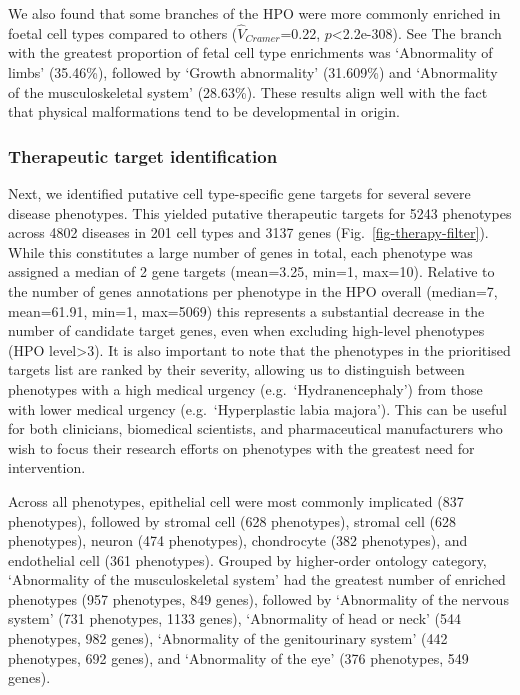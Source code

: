 \documentclass[
]{agujournal2019}
\begin{document}
We also found that some branches of the HPO were more commonly enriched
in foetal cell types compared to others (\(\hat{V}_{Cramer}\)=0.22,
\(p\)\textless2.2e-308). See The branch with the greatest proportion of
fetal cell type enrichments was `Abnormality of limbs' (35.46\%),
followed by `Growth abnormality' (31.609\%) and `Abnormality of the
musculoskeletal system' (28.63\%). These results align well with the
fact that physical malformations tend to be developmental in origin.

\subsubsection{Therapeutic target
identification}\label{therapeutic-target-identification}

Next, we identified putative cell type-specific gene targets for several
severe disease phenotypes. This yielded putative therapeutic targets for
5243 phenotypes across 4802 diseases in 201 cell types and 3137 genes
(Fig.~\ref{fig-therapy-filter}). While this constitutes a large number
of genes in total, each phenotype was assigned a median of 2 gene
targets (mean=3.25, min=1, max=10). Relative to the number of genes
annotations per phenotype in the HPO overall (median=7, mean=61.91,
min=1, max=5069) this represents a substantial decrease in the number of
candidate target genes, even when excluding high-level phenotypes (HPO
level\textgreater3). It is also important to note that the phenotypes in
the prioritised targets list are ranked by their severity, allowing us
to distinguish between phenotypes with a high medical urgency
(e.g.~`Hydranencephaly') from those with lower medical urgency
(e.g.~`Hyperplastic labia majora'). This can be useful for both
clinicians, biomedical scientists, and pharmaceutical manufacturers who
wish to focus their research efforts on phenotypes with the greatest
need for intervention.

Across all phenotypes, epithelial cell were most commonly implicated
(837 phenotypes), followed by stromal cell (628 phenotypes), stromal
cell (628 phenotypes), neuron (474 phenotypes), chondrocyte (382
phenotypes), and endothelial cell (361 phenotypes). Grouped by
higher-order ontology category, `Abnormality of the musculoskeletal
system' had the greatest number of enriched phenotypes (957 phenotypes,
849 genes), followed by `Abnormality of the nervous system' (731
phenotypes, 1133 genes), `Abnormality of head or neck' (544 phenotypes,
982 genes), `Abnormality of the genitourinary system' (442 phenotypes,
692 genes), and `Abnormality of the eye' (376 phenotypes, 549 genes).
\end{document}
